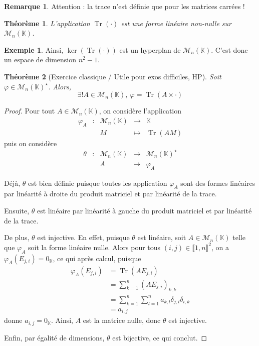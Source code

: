 \documentclass[french]{book}
\newcommand{\K}{\mathbb{K}}
\newcommand{\st}{^\star}
\theoremstyle{plain}
\newtheorem{thm}{Théorème}[chapter]
\theoremstyle{definition}
\newtheorem{exa}{Exemple}[chapter]
\newtheorem{rmq}{Remarque}[chapter]
\theoremstyle{remark}
\DeclareMathOperator{\tr}{Tr}
\begin{document}
\begin{rmq}
	Attention : la trace n'est définie que pour les matrices carrées !
\end{rmq}
\begin{thm}
	L'application $\tr(\cdot)$ est une forme linéaire non-nulle sur $\mathcal{M}_n(\K)$.
\end{thm}
\begin{exa}
	Ainsi, $\ker(\tr(\cdot))$ est un hyperplan de $\mathcal{M}_n(\K)$. C'est donc un espace de dimension $n^2-1$.
\end{exa}
\begin{thm}[Exercice classique / Utile pour exos difficiles, HP]
	Soit $\varphi\in\mathcal{M}_n(\K)\st$. Alors, $$\exists!A\in\mathcal{M}_n(\K),\ \varphi=\tr(A\times\cdot)$$
\end{thm}
\begin{proof}
	Pour tout $A\in\mathcal{M}_n(\K)$, on considère l'application $$\begin{array}{ccccc}\varphi_A&:&\mathcal{M}_n(\K)&\rightarrow&\K\\&&M&\mapsto&\tr(AM)\end{array}$$ puis on considère $$\begin{array}{ccccc}\theta&:&\mathcal{M}_n(\K)&\rightarrow&\mathcal{M}_n(\K)\st\\&&A&\mapsto&\varphi_A\end{array}$$ \par Déjà, $\theta$ est bien définie puisque toutes les application $\varphi_A$ sont des formes linéaires par linéarité à droite du produit matriciel et par linéarité de la trace. \par Ensuite, $\theta$ est linéaire par linéarité à gauche du produit matriciel et par linéarité de la trace.\par De plus, $\theta$ est injective. En effet, puisque $\theta$ est linéaire, soit $A\in\mathcal{M}_n(\K)$ telle que $\varphi_A$ soit la forme linéaire nulle. Alors pour tous $(i,j)\in\llbracket1,n\rrbracket^2$, on a $\varphi_A(E_{j,i})=0_\K$, ce qui après calcul, puisque \begin{align*}
		\varphi_A(E_{j,i})&=\tr(AE_{j,i})\\
		&=\sum_{k=1}^{n}(AE_{j,i})_{k,k}\\
		&=\sum_{k=1}^{n}\sum_{l=1}^{n}a_{k,l}\delta_{j,l}\delta_{i,k}\\
		&=a_{i,j}
	\end{align*} donne $a_{i,j}=0_\K$. Ainsi, $A$ est la matrice nulle, donc $\theta$ est injective. \par Enfin, par égalité de dimensions, $\theta$ est bijective, ce qui conclut.
\end{proof}
\end{document}
